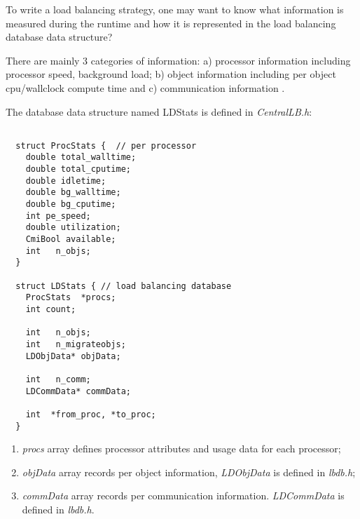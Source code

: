 To write a load balancing strategy, one may want to know 
what information is measured during the runtime and how it is represented in
the load balancing database data structure?

There are mainly 3 categories of information: a) processor information including processor speed, background load; b) object information including per object
cpu/wallclock compute time and c) communication information .

The database data structure named {\kw LDStats} is defined in {\em CentralLB.h}:

\begin{verbatim}

  struct ProcStats {  // per processor
    double total_walltime;
    double total_cputime;
    double idletime;
    double bg_walltime;
    double bg_cputime;
    int pe_speed;
    double utilization;
    CmiBool available;
    int   n_objs;
  }

  struct LDStats { // load balancing database
    ProcStats  *procs;
    int count;

    int   n_objs;
    int   n_migrateobjs;
    LDObjData* objData;

    int   n_comm;
    LDCommData* commData;

    int  *from_proc, *to_proc;
  }

\end{verbatim}

\begin{enumerate}
\item {\em procs} array defines processor attributes and usage data for each
processor;
\item {\em objData} array records per object information, {\em LDObjData} is defined in {\em lbdb.h};
\item {\em commData} array records per communication information. {\em LDCommData} is defined in {\em lbdb.h}.
\end{enumerate}

